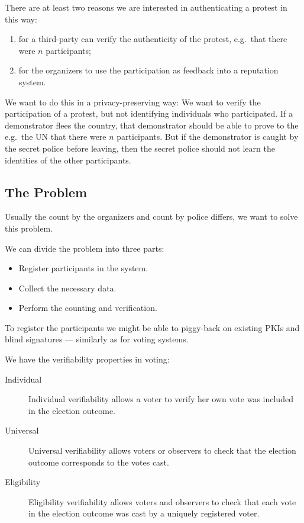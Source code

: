 There are at least two reasons we are interested in authenticating a protest in 
this way:
\begin{enumerate}
  \item for a third-party can verify the authenticity of the protest, e.g.\ 
    that there were \(n\) participants;
  \item for the organizers to use the participation as feedback into 
    a reputation system.
\end{enumerate}
We want to do this in a privacy-preserving way:
We want to verify the participation of a protest, but not identifying 
individuals who participated.
If a demonstrator flees the country, that demonstrator should be able to prove 
to the e.g.\ the UN that there were \(n\) participants.
But if the demonstrator is caught by the secret police before leaving, then the 
secret police should not learn the identities of the other participants.

\subsection{The Problem}

Usually the count by the organizers and count by police differs, we want to 
solve this problem.

We can divide the problem into three parts:
\begin{itemize}
  \item Register participants in the system.
  \item Collect the necessary data.
  \item Perform the counting and verification.
\end{itemize}

To register the participants we might be able to piggy-back on existing 
\acp{PKI} and blind signatures --- similarly as for voting systems.

We have the verifiability properties in voting:
\begin{description}
  \item[Individual] Individual verifiability allows a voter to verify her own 
    vote was included in the election outcome.
  \item[Universal] Universal verifiability allows voters or observers to check 
    that the election outcome corresponds to the votes cast.
  \item[Eligibility] Eligibility verifiability allows voters and observers to 
    check that each vote in the election outcome was cast by a uniquely 
    registered voter.
\end{description}



